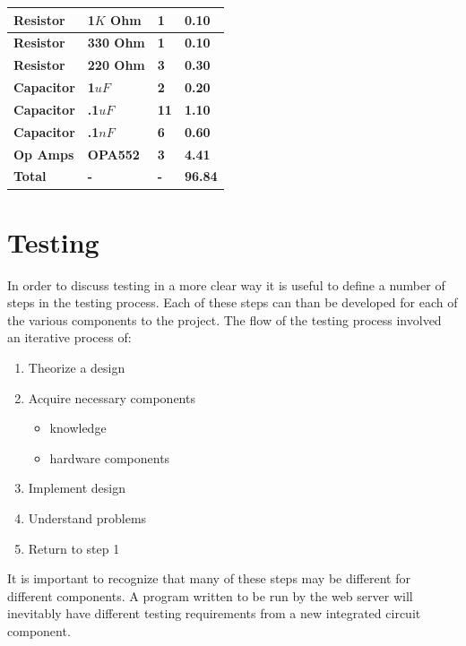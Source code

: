 \documentclass{article}	%
\begin{document}
\begin{multicols}{2}
\begin{center}
\begin{tabularx}{0.4\textwidth}{|X|X|X|X|}
        \textbf{Resistor} &
        \textbf{1$K$ Ohm } &
        \textbf{1} &
        \textbf{0.10} \\
        \hline

        \textbf{Resistor} &
        \textbf{330 Ohm } &
        \textbf{1} &
        \textbf{0.10} \\
        \hline

        \textbf{Resistor} &
        \textbf{220 Ohm} &
        \textbf{3} &
        \textbf{0.30} \\
        \hline

        \textbf{Capacitor} &
        \textbf{1$uF$ } &
        \textbf{2} &
        \textbf{0.20} \\
        \hline

        \textbf{Capacitor} &
        \textbf{.1$uF$} &
        \textbf{11} &
        \textbf{1.10} \\
        \hline

        \textbf{Capacitor} &
        \textbf{.1$nF$} &
        \textbf{6} &
        \textbf{0.60} \\
        \hline

        \textbf{Op Amps} &
        \textbf{OPA552} &
        \textbf{3} &
        \textbf{4.41} \\
        \hline

        \hline
        \textbf{Total} &
        \textbf{-} &
        \textbf{-} &
        \textbf{96.84} \\

        \hline
    \end{tabularx}
\end{center}

\section{Testing}
In order to discuss testing in a more clear way
it is useful to define a number of steps
in the testing process.
Each of these steps can than be developed for
each of the various components to the project.
%
The flow of the testing process
involved an iterative process of:
\begin{enumerate}
\item Theorize a design
\item Acquire necessary components
    \begin{itemize}
    \item knowledge
    \item hardware components
    \end{itemize}
\item Implement design
\item Understand problems
\item Return to step 1
\end{enumerate}
%
It is important to recognize that many
of these steps may be different for different components.
A program written to be run by the web server
will inevitably have different testing requirements from
a new integrated circuit component.


\end{multicols}
\end{document}
